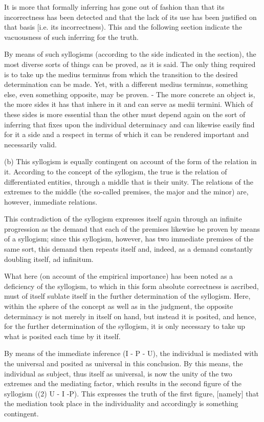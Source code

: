 It is more that formally inferring has gone out of fashion than that
its incorrectness has been detected and that the lack of its use has
been justified on that basis [i.e. its incorrectness). This and the
following section indicate the vacuousness of such
inferring for the truth.

By means of such syllogisms (according to the side indicated in
the section), the most diverse sorts of things can be proved, as it is
said. The only thing required is to take up the medius terminus from
which the transition to the desired determination can be made. Yet,
with a different medius terminus, something else, even something
opposite, may be proven. - The more concrete an object is, the more
sides it has that inhere in it and can serve as medii termini. Which of
these sides is more essential than the other must depend again on the
sort of inferring that fixes upon the individual determinacy and can
likewise easily find for it a side and a respect in terms of which it can
be rendered important and necessarily valid.

(b) This syllogism is equally contingent on account of
the form of the relation in it.
According to the concept of the syllogism,
the true is the relation of differentiated entities,
through a middle that is their unity.
The relations of the extremes to the middle
(the so-called premises, the major and the minor)
are, however, immediate relations.

This contradiction of the syllogism expresses itself again through an
infinite progression as the demand that each of the premises
likewise be proven by means of a syllogism; since this syllogism,
however, has two immediate premises of the same sort, this demand
then repeats itself and, indeed, as a demand constantly doubling
itself, ad infinitum.

What here (on account of the empirical importance) has been noted as
a deficiency of the syllogism, to which in this form absolute correctness
is ascribed, must of itself sublate itself in the
further determination of the syllogism. Here, within the sphere of the
concept as well as in the judgment, the opposite determinacy is not merely
in itself on hand, but instead it is posited, and hence, for the further
determination of the syllogism, it is only necessary to take up what is
posited each time by it itself.

By means of the immediate inference (I - P - U), the individual is
mediated with the universal and posited as universal in this conclusion.
By this means, the individual as subject, thus itself as universal,
is now the unity of the two extremes and the mediating factor, which results
in the second figure of the syllogism ((2) U - I -P). This expresses the truth of
the first figure, [namely] that the mediation took place in the individuality
and accordingly is something contingent.

